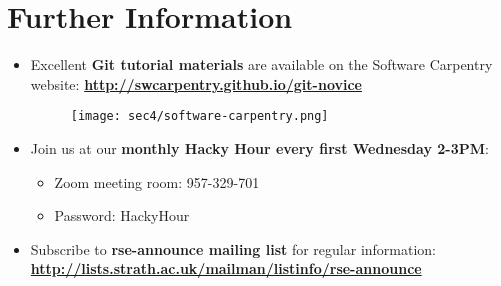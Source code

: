 \section{Further Information}\hypertarget{sec3}{}

\begin{frame}[fragile]
\emptyframetitle

\begin{itemize}
\setlength{\itemsep}{10pt}
  \item  Excellent \textbf{Git tutorial materials} are available on the Software Carpentry website:
  \textbf{\url{http://swcarpentry.github.io/git-novice}}\\
  \begin{figure}[h]
\begin{center}
    \texttt{[image: sec4/software-carpentry.png]}
\end{center}
  \end{figure}

  \item Join us at our \textbf{monthly Hacky Hour every first Wednesday 2-3PM}:
  \begin{itemize}
    \item[] \normalsize Zoom meeting room: 957-329-701
    \item[] \normalsize Password: HackyHour
  \end{itemize}

  \item Subscribe to \textbf{rse-announce mailing list} for regular information:\\
  \textbf{\small\url{http://lists.strath.ac.uk/mailman/listinfo/rse-announce}}
\end{itemize}

\end{frame}

